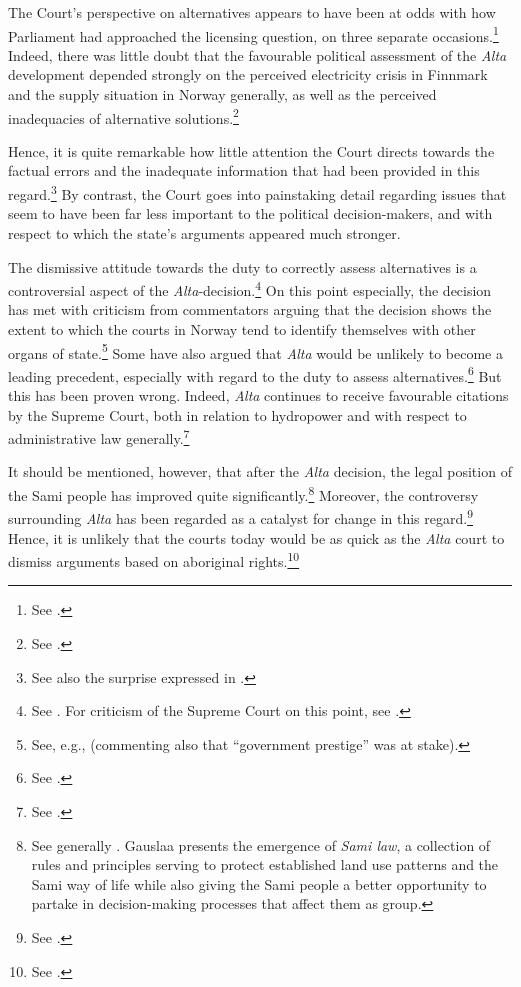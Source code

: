 The Court's perspective on alternatives appears to have been at odds with how Parliament had approached the licensing question, on three separate occasions.\footnote{See \cite[342]{alta82}.} Indeed, there was little doubt that the favourable political assessment of the {\it Alta} development depended strongly on the perceived electricity crisis in Finnmark and the supply situation in Norway generally, as well as the perceived inadequacies of alternative solutions.\footnote{See \cite[338-347]{alta82}.}

Hence, it is quite remarkable how little attention the Court directs towards the factual errors and the inadequate information that had been provided in this regard.\footnote{See also the surprise expressed in \cite[349-351]{eckhoff82}.} By contrast, the Court goes into painstaking detail regarding issues that seem to have been far less important to the political decision-makers, and with respect to which the state's arguments appeared much stronger.

The dismissive attitude towards the duty to correctly assess alternatives is a controversial aspect of the {\it Alta}-decision.\footnote{See \cite[311]{haagensen02}. For criticism of the Supreme Court on this point, see \cite[580-584]{backer86}.} On this point especially, the decision has met with criticism from commentators arguing that the decision shows the extent to which the courts in Norway tend to identify themselves with other organs of state.\footnote{See, e.g., \cite[64]{graver88} (commenting also that ``government prestige'' was at stake).} Some have also argued that {\it Alta} would be unlikely to become a leading precedent, especially with regard to the duty to assess alternatives.\footnote{See \cite[580-584]{backer86}.} But this has been proven wrong. Indeed, {\it Alta} continues to receive favourable citations by the Supreme Court, both in relation to hydropower and with respect to administrative law generally.\footnote{See \cite{ambassade09,jorpeland11}.}

It should be mentioned, however, that after the {\it Alta} decision, the legal position of the Sami people has improved quite significantly.\footnote{See generally \cite{gauslaa07}. Gauslaa presents the emergence of {\it Sami law}, a collection of rules and principles serving to protect established land use patterns and the Sami way of life while also giving the Sami people a better opportunity to partake in decision-making processes that affect them as group.} Moreover, the controversy surrounding {\it Alta} has been regarded as a catalyst for change in this regard.\footnote{See \cite[156]{ravna12s}.} Hence, it is unlikely that the courts today would be as quick as the {\it Alta} court to dismiss arguments based on aboriginal rights.\footnote{See \cite[180]{gauslaa07}.}

